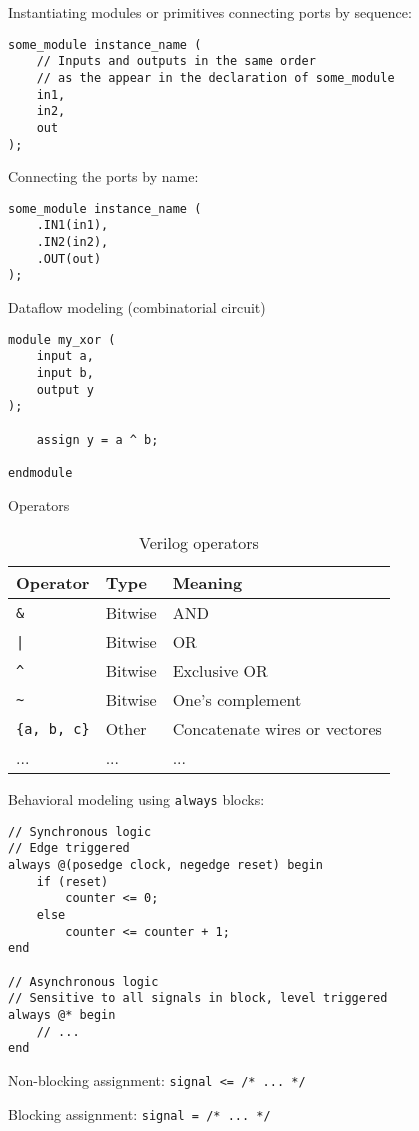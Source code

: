 \documentclass[fontsize=11pt,a4paper]{scrartcl}
\begin{document}
Instantiating modules or primitives connecting ports by sequence:
\begin{lstlisting}
some_module instance_name (
	// Inputs and outputs in the same order
	// as the appear in the declaration of some_module
	in1,
	in2,
	out
);
\end{lstlisting}

Connecting the ports by name:
\begin{lstlisting}
some_module instance_name (
	.IN1(in1),
	.IN2(in2),
	.OUT(out)
);
\end{lstlisting}

Dataflow modeling (combinatorial circuit)
\begin{lstlisting}
module my_xor (
	input a,
	input b,
	output y
);

	assign y = a ^ b;

endmodule
\end{lstlisting}

Operators
\begin{table}[htb]
	\centering
	\begin{tabular}{lll}
	\toprule
		\textbf{Operator} & \textbf{Type} & \textbf{Meaning} \\
	\midrule
		\lstinline!&! & Bitwise & AND \\
		\lstinline!|! & Bitwise & OR \\
		\lstinline!^! & Bitwise & Exclusive OR \\
		\lstinline!~! & Bitwise & One's complement \\
		\lstinline!{a, b, c}! & Other & Concatenate wires or vectores \\
		... & ... & ...\\
	\bottomrule
	\end{tabular}
	\caption{Verilog operators}
	\label{tab:operators}
\end{table}

Behavioral modeling using \lstinline!always! blocks:
\begin{lstlisting}
// Synchronous logic
// Edge triggered
always @(posedge clock, negedge reset) begin
	if (reset)
		counter <= 0;
	else
		counter <= counter + 1;
end

// Asynchronous logic
// Sensitive to all signals in block, level triggered
always @* begin
	// ...
end
\end{lstlisting}

Non-blocking assignment: \lstinline!signal <= /* ... */!

Blocking assignment: \lstinline!signal = /* ... */!
\end{document}
